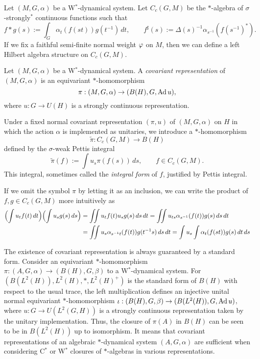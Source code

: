 \documentclass{../../../small}
\begin{document}
\begin{defn}
Let $(M,G,\alpha)$ be a W$^*$-dynamical system.
Let $C_c(G,M)$ be the $*$-algebra of $\sigma$-strongly$^*$ continuous functions such that
\[f*g(s):=\int_G\alpha_t(f(st))g(t^{-1})\,dt,\qquad f^\sharp(s):=\Delta(s)^{-1}\alpha_{s^{-1}}(f(s^{-1})^*).\]
If we fix a faithful semi-finite normal weight $\varphi$ on $M$, then we can define a left Hilbert algebra structure on $C_c(G,M)$.
\end{defn}


\begin{defn}
Let $(M,G,\alpha)$ be a W$^*$-dynamical system.
A \emph{covariant representation} of $(M,G,\alpha)$ is an equivariant $*$-homomorphism
\[\pi:(M,G,\alpha)\to(B(H),G,\operatorname{Ad} u),\]
where $u:G\to U(H)$ is a strongly continuous representation.

Under a fixed normal covariant representation $(\pi,u)$ of $(M,G,\alpha)$ on $H$ in which the action $\alpha$ is implemented as unitaries, we introduce a $*$-homomorphism
\[\tilde\pi:C_c(G,M)\to B(H)\]
defined by the $\sigma$-weak Pettis integral
\[\tilde\pi(f):=\int u_s\pi(f(s))\,ds,\qquad f\in C_c(G,M).\]
This integral, sometimes called the \emph{integral form} of $f$, justified by Pettis integral.
\end{defn}


\begin{rmk*}
If we omit the symbol $\pi$ by letting it as an inclusion, we can write the product of $f,g\in C_c(G,M)$ more intuitively as
\begin{align*}
\Bigl(\int u_tf(t)\,dt\Bigr)\Bigl(\int u_sg(s)\,ds\Bigr)
&=\iint u_tf(t)u_sg(s)\,ds\,dt=\iint u_{ts}\alpha_{s^{-1}}(f(t))g(s)\,ds\,dt\\
&=\iint u_s\alpha_{s^{-1}t}(f(t))g(t^{-1}s)\,ds\,dt=\int u_s\int\alpha_t(f(st))g(s)\,dt\,ds
\end{align*}
\end{rmk*}

\begin{rmk*}
The existence of covariant representation is always guaranteed by a standard form.
Consider an equivariant $*$-homomorphism $\pi:(A,G,\alpha)\to(B(H),G,\beta)$ to a W$^*$-dynamical system.
For $(B(L^2(H)),L^2(H),*,L^2(H)^+)$ is the standard form of $B(H)$ with respect to the usual trace, the left multiplication defines an injective unital normal equivariant $*$-homomorphism $\iota:(B(H),G,\beta)\to(B(L^2(H)),G,\operatorname{Ad} u)$, where $u:G\to U(L^2(G,H))$ is a strongly continuous representation taken by the unitary implementation.
Thus, the closure of $\pi(A)$ in $B(H)$ can be seen to be in $B(L^2(H))$ up to isomorphism.
It means that covariant representations of an algebraic $*$-dynamical system $(A,G,\alpha)$ are sufficient when considering C$^*$ or W$^*$ closures of $*$-algebras in various representations.
\end{rmk*}
\end{document}
